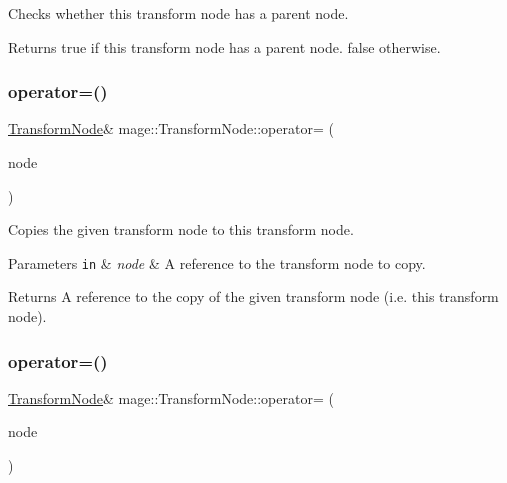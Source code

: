 Checks whether this transform node has a parent node.

\begin{DoxyReturn}{Returns}
{\ttfamily true} if this transform node has a parent node. {\ttfamily false} otherwise. 
\end{DoxyReturn}
\hypertarget{structmage_1_1_transform_node_afd5f7d7b377b1a85cbe1d64f8f0df49a}{}\label{structmage_1_1_transform_node_afd5f7d7b377b1a85cbe1d64f8f0df49a} 
\subsubsection{\texorpdfstring{operator=()}{operator=()}\hspace{0.1cm}{\footnotesize\ttfamily [1/2]}}
{\footnotesize\ttfamily \hyperlink{structmage_1_1_transform_node}{Transform\+Node}\& mage\+::\+Transform\+Node\+::operator= (\begin{DoxyParamCaption}\item[{const \hyperlink{structmage_1_1_transform_node}{Transform\+Node} \&}]{node }\end{DoxyParamCaption})\hspace{0.3cm}{\ttfamily [delete]}}

Copies the given transform node to this transform node.


\begin{DoxyParams}[1]{Parameters}
\mbox{\tt in}  & {\em node} & A reference to the transform node to copy. \\
\hline
\end{DoxyParams}
\begin{DoxyReturn}{Returns}
A reference to the copy of the given transform node (i.\+e. this transform node). 
\end{DoxyReturn}
\hypertarget{structmage_1_1_transform_node_a8dcd5a36ad95917216df628d309b294d}{}\label{structmage_1_1_transform_node_a8dcd5a36ad95917216df628d309b294d} 
\subsubsection{\texorpdfstring{operator=()}{operator=()}\hspace{0.1cm}{\footnotesize\ttfamily [2/2]}}
{\footnotesize\ttfamily \hyperlink{structmage_1_1_transform_node}{Transform\+Node}\& mage\+::\+Transform\+Node\+::operator= (\begin{DoxyParamCaption}\item[{\hyperlink{structmage_1_1_transform_node}{Transform\+Node} \&\&}]{node }\end{DoxyParamCaption})\hspace{0.3cm}{\ttfamily [delete]}}

